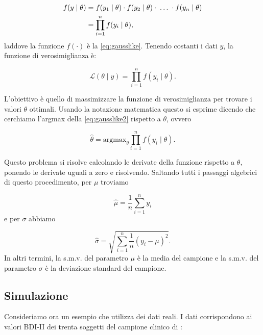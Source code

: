 \documentclass[
]{memoir}
\theoremstyle{definition}
\theoremstyle{definition}
\theoremstyle{definition}
\theoremstyle{definition}
\theoremstyle{remark}
\begin{document}
\begin{align}
f(y \mid \theta) &= f(y_1 \mid \theta) \cdot f(y_2 \mid \theta) \cdot \; \dots \; \cdot f(y_n \mid \theta)\notag\\
                 &= \prod_{i=1}^n f(y_i \mid \theta),
\label{eq:gauss-prob-cong}
\end{align}
\noindent
laddove la funzione \(f(\cdot)\) è la \eqref{eq:gausslike}. Tenendo costanti i dati \(y\), la funzione di verosimiglianza è:

\begin{equation}
\mathcal{L}(\theta \mid y) = \prod_{i=1}^n f(y_i \mid \theta).
\label{eq:gausslike2}
\end{equation}

L'obiettivo è quello di massimizzare la funzione di verosimiglianza per trovare i valori \(\theta\) ottimali. Usando la notazione matematica questo si esprime dicendo che cerchiamo l'argmax della \eqref{eq:gausslike2} rispetto a \(\theta\), ovvero

\[
\hat{\theta} = \text{argmax}_{\theta} \prod_{i=1}^n f(y_i \mid \theta).
\]

Questo problema si risolve calcolando le derivate della funzione rispetto a \(\theta\), ponendo le derivate uguali a zero e risolvendo. Saltando tutti i passaggi algebrici di questo procedimento, per \(\mu\) troviamo

\begin{equation}
\hat{\mu} = \frac{1}{n} \sum_{i=1}^n y_i
\label{eq:maxlikemu}
\end{equation}
e per \(\sigma\) abbiamo

\begin{equation}
\hat{\sigma} = \sqrt{\sum_{i=1}^n\frac{1}{n}(y_i- \mu)^2}.
\label{eq:maxlikesigma}
\end{equation}
In altri termini, la s.m.v. del parametro \(\mu\) è la media del campione e la s.m.v. del parametro \(\sigma\) è la deviazione standard del campione.

\hypertarget{simulazione}{%
\subsection{Simulazione}\label{simulazione}}

Consideriamo ora un esempio che utilizza dei dati reali. I dati corrispondono ai valori BDI-II dei trenta soggetti del campione clinico di \citet{zetschefuture2019}:
\end{document}
